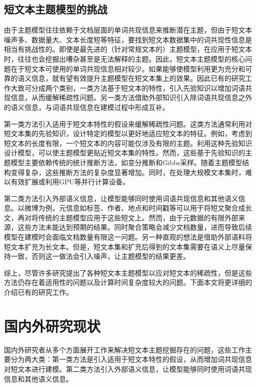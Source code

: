 \subsection{短文本主题模型的挑战}
由于主题模型往往依赖于文档层面的单词共现信息来推断潜在主题\cite{STTM}，但由于短文本噪声多、数据量大、文本长度短等特征，要找到短文本数据集中的词共现性信息是相当有挑战性的。即使是最先进的（针对常规文本的）主题模型，在应用于短文本时，往往也会挖掘出嘈杂甚至是无法解释的主题。因此，短文本主题模型的核心问题在于短文本可使用的单词共现信息相对较少。如果能够使模型利用更为充分和可靠的语义信息，就有望有效提升主题模型在短文本集上的效果。因此已有的研究工作大致可分成两个类别\cite{ZJHNY}，一类方法基于短文本的特性，引入先验知识以增加词语共现信息，从而缓解稀疏性问题。另一类方法借助外部知识引入除词语共现信息之外的语义信息，与词语共现信息在建模过程中形成互补。

第一类方法引入适用于短文本特性的假设来缓解稀疏性问题。这类方法通常利用对短文本集的先验知识，设计特定的模型以更好地适应短文本的特征。例如，考虑到短文本的长度有限，一个短文本的内容可能仅涉及有限的主题。利用这种先验知识设计模型，可以使主题模型更贴近短文本集的特性。然而，这些基于先验知识的主题模型主要依赖传统的统计推断方法，如变分推断和Gibbs采样。随着主题模型结构变得复杂，这些推断方法的复杂度显著增加。同时，在处理大规模文本集时，难以有效扩展或利用GPU等并行计算设备\cite{NTMsurvey}。

第二类方法引入外部语义信息，让模型能够同时使用词语共现信息和其他语义信息。以微博为例，元信息如标签、作者、地点和时间戳等可以用于将短文聚合成长文，再对将传统的主题模型应用于这些短文上。然而，由于元数据的有限外部来源，这些方法未能达到预期的结果。同时聚合策略会减少文档数量，进而导致后续模型在建模时会面临文档数量有限这一问题。另一种直观的想法是借助外部语料将短文本扩充为长文本。但是，短文本集和扩充后得到的文本集需要在语义上尽量保持一致，否则这一做法会引入噪声，让主题模型的结果更差\cite{ZJHNY}。

综上，尽管许多研究提出了各种短文本主题模型以应对短文本的稀疏性，但是这些方法仍存在着适用性的问题以及计算时间复杂度较大的问题。下面本文将更详细的介绍已有的研究工作。

\section{国内外研究现状}\label{sec:relatedWork}
国内外研究者从多个方面展开工作来解决短文本主题挖掘存在的问题，这些工作主要分为两大类：第一类方法是引入适用于短文本特性的假设，从而增加词共现信息对短文本进行建模。第二类方法引入外部语义信息，让模型能够同时使用词语共现信息和其他语义信息。

